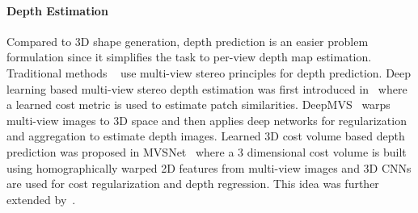 \paragraph{Depth Estimation}
Compared to 3D shape generation, depth prediction is an easier problem formulation since it simplifies the task to per-view depth map estimation.
Traditional methods ~\cite{campbell2008using,galliani2015massively,schonberger2016pixelwise} use multi-view stereo principles for depth prediction.
Deep learning based multi-view stereo depth estimation was first introduced in~\cite{hartmann2017learned_16} where a learned cost metric is used to estimate patch similarities.
DeepMVS~\cite{deepmvs2018} warps multi-view images to 3D space and then applies deep networks for regularization and aggregation to estimate depth images.
Learned 3D cost volume based depth prediction was proposed in MVSNet~\cite{yao2018mvsnet} where a 3 dimensional cost volume is built using homographically warped 2D features from multi-view images and 3D CNNs are used for cost regularization and depth regression.
This idea was further extended by~\cite{chen2019point,luo2019pmvsnet, gu2019cascade,yao2019recurrent}.

